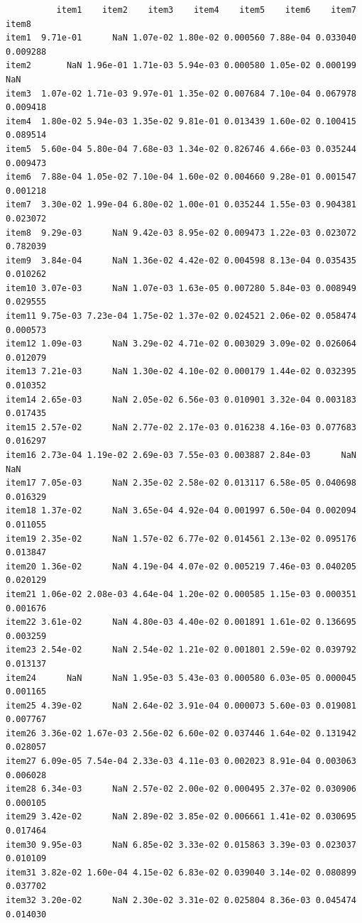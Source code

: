 \documentclass[
  a4paper,
]{ltjsbook}
\begin{document}
\begin{verbatim}
          item1    item2    item3    item4    item5    item6    item7    item8
item1  9.71e-01      NaN 1.07e-02 1.80e-02 0.000560 7.88e-04 0.033040 0.009288
item2       NaN 1.96e-01 1.71e-03 5.94e-03 0.000580 1.05e-02 0.000199      NaN
item3  1.07e-02 1.71e-03 9.97e-01 1.35e-02 0.007684 7.10e-04 0.067978 0.009418
item4  1.80e-02 5.94e-03 1.35e-02 9.81e-01 0.013439 1.60e-02 0.100415 0.089514
item5  5.60e-04 5.80e-04 7.68e-03 1.34e-02 0.826746 4.66e-03 0.035244 0.009473
item6  7.88e-04 1.05e-02 7.10e-04 1.60e-02 0.004660 9.28e-01 0.001547 0.001218
item7  3.30e-02 1.99e-04 6.80e-02 1.00e-01 0.035244 1.55e-03 0.904381 0.023072
item8  9.29e-03      NaN 9.42e-03 8.95e-02 0.009473 1.22e-03 0.023072 0.782039
item9  3.84e-04      NaN 1.36e-02 4.42e-02 0.004598 8.13e-04 0.035435 0.010262
item10 3.07e-03      NaN 1.07e-03 1.63e-05 0.007280 5.84e-03 0.008949 0.029555
item11 9.75e-03 7.23e-04 1.75e-02 1.37e-02 0.024521 2.06e-02 0.058474 0.000573
item12 1.09e-03      NaN 3.29e-02 4.71e-02 0.003029 3.09e-02 0.026064 0.012079
item13 7.21e-03      NaN 1.30e-02 4.10e-02 0.000179 1.44e-02 0.032395 0.010352
item14 2.65e-03      NaN 2.05e-02 6.56e-03 0.010901 3.32e-04 0.003183 0.017435
item15 2.57e-02      NaN 2.77e-02 2.17e-03 0.016238 4.16e-03 0.077683 0.016297
item16 2.73e-04 1.19e-02 2.69e-03 7.55e-03 0.003887 2.84e-03      NaN      NaN
item17 7.05e-03      NaN 2.35e-02 2.58e-02 0.013117 6.58e-05 0.040698 0.016329
item18 1.37e-02      NaN 3.65e-04 4.92e-04 0.001997 6.50e-04 0.002094 0.011055
item19 2.35e-02      NaN 1.57e-02 6.77e-02 0.014561 2.13e-02 0.095176 0.013847
item20 1.36e-02      NaN 4.19e-04 4.07e-02 0.005219 7.46e-03 0.040205 0.020129
item21 1.06e-02 2.08e-03 4.64e-04 1.20e-02 0.000585 1.15e-03 0.000351 0.001676
item22 3.61e-02      NaN 4.80e-03 4.40e-02 0.001891 1.61e-02 0.136695 0.003259
item23 2.54e-02      NaN 2.54e-02 1.21e-02 0.001801 2.59e-02 0.039792 0.013137
item24      NaN      NaN 1.95e-03 5.43e-03 0.000580 6.03e-05 0.000045 0.001165
item25 4.39e-02      NaN 2.64e-02 3.91e-04 0.000073 5.60e-03 0.019081 0.007767
item26 3.36e-02 1.67e-03 2.56e-02 6.60e-02 0.037446 1.64e-02 0.131942 0.028057
item27 6.09e-05 7.54e-04 2.33e-03 4.11e-03 0.002023 8.91e-04 0.003063 0.006028
item28 6.34e-03      NaN 2.57e-02 2.00e-02 0.000495 2.37e-02 0.030906 0.000105
item29 3.42e-02      NaN 2.89e-02 3.85e-02 0.006661 1.41e-02 0.030695 0.017464
item30 9.95e-03      NaN 6.85e-02 3.33e-02 0.015863 3.39e-03 0.023037 0.010109
item31 3.82e-02 1.60e-04 4.15e-02 6.83e-02 0.039040 3.14e-02 0.080899 0.037702
item32 3.20e-02      NaN 2.30e-02 3.31e-02 0.025804 8.36e-03 0.045474 0.014030

\end{verbatim}
\end{document}
